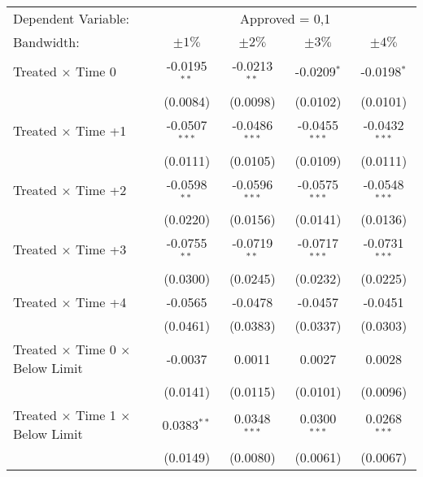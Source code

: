 \begin{tabular*}{0.8\textwidth}{@{\extracolsep{\fill}}lcccc}
   \toprule
   Dependent Variable: & \multicolumn{4}{c}{Approved = 0,1}\\
   Bandwidth:                                          & $\pm1\%$            & $\pm2\%$            & $\pm3\%$            & $\pm4\%$  \\  
   \midrule
    Treated $\times$ Time 0                          & -0.0195$^{**}$  & -0.0213$^{**}$  & -0.0209$^{*}$   & -0.0198$^{*}$\\   
                                                     & (0.0084)        & (0.0098)        & (0.0102)        & (0.0101)\\   
    Treated $\times$ Time +1                          & -0.0507$^{***}$ & -0.0486$^{***}$ & -0.0455$^{***}$ & -0.0432$^{***}$\\   
                                                     & (0.0111)        & (0.0105)        & (0.0109)        & (0.0111)\\   
    Treated $\times$ Time +2                          & -0.0598$^{**}$  & -0.0596$^{***}$ & -0.0575$^{***}$ & -0.0548$^{***}$\\   
                                                     & (0.0220)        & (0.0156)        & (0.0141)        & (0.0136)\\   
    Treated $\times$ Time +3                          & -0.0755$^{**}$  & -0.0719$^{**}$  & -0.0717$^{***}$ & -0.0731$^{***}$\\   
                                                     & (0.0300)        & (0.0245)        & (0.0232)        & (0.0225)\\   
    Treated $\times$ Time +4                          & -0.0565         & -0.0478         & -0.0457         & -0.0451\\   
                                                     & (0.0461)        & (0.0383)        & (0.0337)        & (0.0303)\\   
   Treated $\times$ Time 0 $\times$ Below Limit      & -0.0037         & 0.0011          & 0.0027          & 0.0028\\   
                                                     & (0.0141)        & (0.0115)        & (0.0101)        & (0.0096)\\   
   Treated $\times$ Time 1 $\times$ Below Limit      & 0.0383$^{**}$   & 0.0348$^{***}$  & 0.0300$^{***}$  & 0.0268$^{***}$\\   
                                                     & (0.0149)        & (0.0080)        & (0.0061)        & (0.0067)\\   

\end{tabular*}
